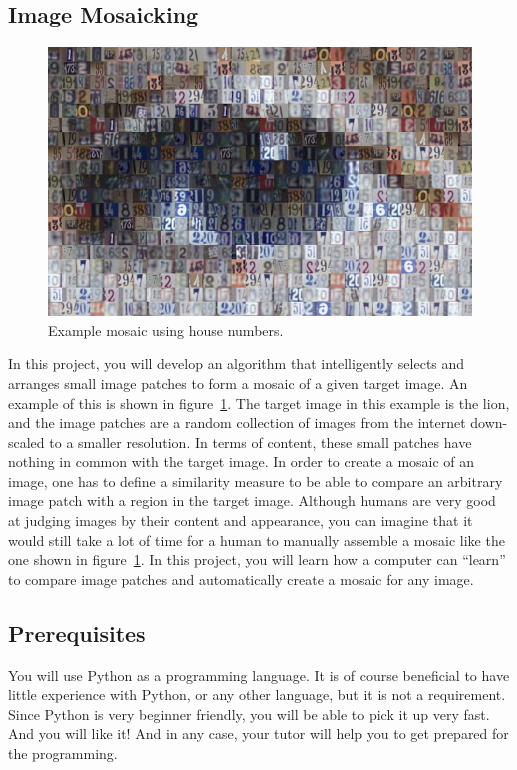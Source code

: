 \documentclass[a4paper]{article}
\begin{document}
	\subsection{Image Mosaicking}
		\begin{figure}
			\centering
			\includegraphics[width=0.7\linewidth]{eye-mosaic}
			\caption{Example mosaic using house numbers.}
			\label{fig:eye-mosaic}
			\label{fig:mosaicking-example}
		\end{figure}
		In this project, you will develop an algorithm that intelligently selects and arranges small image patches to form a mosaic of a given target image.
		An example of this is shown in figure~\ref{fig:mosaicking-example}. 
		The target image in this example is the lion, and the image patches are a random collection of images from the internet down-scaled to a smaller resolution.
		In terms of content, these small patches have nothing in common with the target image.
		In order to create a mosaic of an image, one has to define a similarity measure to be able to compare an arbitrary image patch with a region in the target image. 
		Although humans are very good at judging images by their content and appearance, you can imagine that it would still take a lot of time for a human to manually assemble a mosaic like the one shown in figure~\ref{fig:mosaicking-example}.
		In this project, you will learn how a computer can ``learn'' to compare image patches and automatically create a mosaic for any image.
	
	\subsection{Prerequisites}
		You will use Python as a programming language. 
		It is of course beneficial to have little experience with Python, or any other language, but it is not a requirement.
		Since Python is very beginner friendly, you will be able to pick it up very fast. 
		And you will like it!
		And in any case, your tutor will help you to get prepared for the programming.
		
\end{document}
